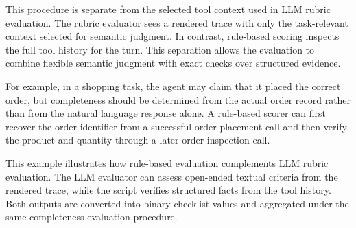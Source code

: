 This procedure is separate from the selected tool context used in LLM rubric evaluation. The rubric evaluator sees a rendered trace with only the task-relevant context selected for semantic judgment. In contrast, rule-based scoring inspects the full tool history for the turn. This separation allows the evaluation to combine flexible semantic judgment with exact checks over structured evidence.

For example, in a shopping task, the agent may claim that it placed the correct order, but completeness should be determined from the actual order record rather than from the natural language response alone. A rule-based scorer can first recover the order identifier from a successful order placement call and then verify the product and quantity through a later order inspection call.



This example illustrates how rule-based evaluation complements LLM rubric evaluation. The LLM evaluator can assess open-ended textual criteria from the rendered trace, while the script verifies structured facts from the tool history. Both outputs are converted into binary checklist values and aggregated under the same completeness evaluation procedure.